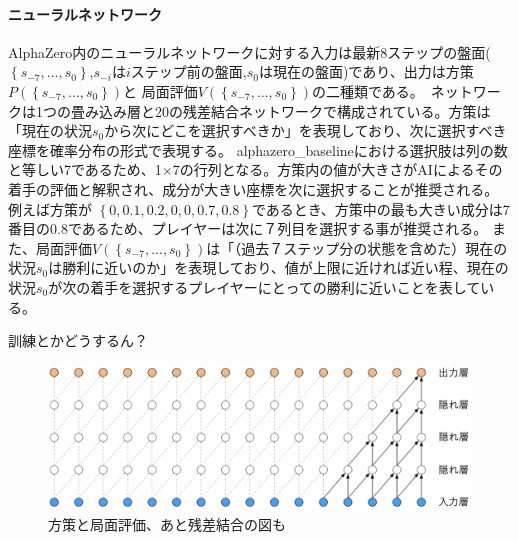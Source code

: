 \paragraph{ニューラルネットワーク}
AlphaZero内のニューラルネットワークに対する入力は最新$8$ステップの盤面($\left\{ s_{-7}, ..., s_0 \right\}$,$s_{-i}$は$i$ステップ前の盤面,$s_{0}$は現在の盤面)であり、出力は方策$P(\left\{ s_{-7}, ..., s_0 \right\})$と
局面評価$V(\left\{ s_{-7}, ..., s_0 \right\})$の二種類である。\
ネットワークは1つの畳み込み層と20の残差結合ネットワークで構成されている。方策は「現在の状況$s_0$から次にどこを選択すべきか」を表現しており、次に選択すべき座標を確率分布の形式で表現する。
alphazero\_baselineにおける選択肢は列の数と等しい7であるため、1$\times$7の行列となる。方策内の値が大きさがAIによるその着手の評価と解釈され、成分が大きい座標を次に選択することが推奨される。例えば方策が
$\left\{0, 0.1, 0.2, 0, 0, 0.7, 0.8\right\}$であるとき、方策中の最も大きい成分は7番目の0.8であるため、プレイヤーは次に７列目を選択する事が推奨される。
また、局面評価$V(\left\{ s_{-7}, ..., s_0 \right\})$は「（過去７ステップ分の状態を含めた）現在の状況$s_0$は勝利に近いのか」を表現しており、値が上限に近ければ近い程、現在の状況$s_0$が次の着手を選択するプレイヤーにとっての勝利に近いことを表している。

訓練とかどうするん？
\begin{figure}[t]
	\centering
	\includegraphics[width=\linewidth]{./figure/ccl.png}
	\caption{方策と局面評価、あと残差結合の図も}
	\label{fig:ccl}
\end{figure}
